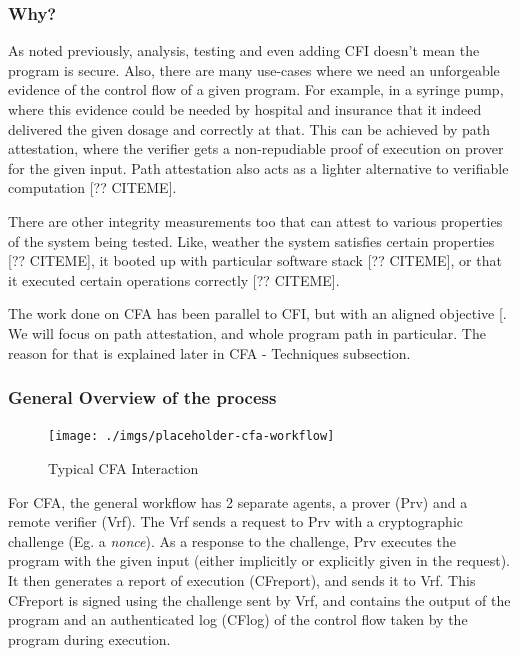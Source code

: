 \documentclass[a4paper, nobind]{templates/ociamthesis}
\begin{document}
\subsubsection{Why?}\label{why}

As noted previously, analysis, testing and even adding CFI doesn't mean the program is secure.
Also, there are many use-cases where we need an unforgeable evidence of the control flow
of a given program. For example, in a syringe pump, where this evidence could be
needed by hospital and insurance that it indeed delivered the given dosage and correctly at that.
This can be achieved by path attestation, where the verifier gets a non-repudiable
proof of execution on prover for the given input.
Path attestation also acts as a lighter alternative to verifiable computation {[}?? CITEME{]}.

There are other integrity measurements too that can attest to various properties
of the system being tested.
Like, weather the system satisfies certain properties {[}?? CITEME{]}, it booted up
with particular software stack {[}?? CITEME{]}, or that it executed certain operations correctly {[}?? CITEME{]}.

The work done on CFA has been parallel to CFI, but with an aligned objective {[}\citeproc{ref-sok}{2}{]}.
We will focus on path attestation, and whole program path in particular.
The reason for that is explained later in CFA - Techniques subsection.

\subsubsection{General Overview of the process}\label{general-overview-of-the-process}

\begin{figure}[H]

{\centering \texttt{[image: ./imgs/placeholder-cfa-workflow]} 

}

\caption{Typical CFA Interaction}\label{fig:cfa-workflow}
\end{figure}

For CFA, the general workflow has 2 separate agents, a prover (Prv) and a remote verifier (Vrf).
The Vrf sends a request to Prv with a cryptographic challenge (Eg. a \emph{nonce}).
As a response to the challenge, Prv executes the program with the given
input (either implicitly or explicitly given in the request).
It then generates a report of execution (CFreport), and sends it to Vrf.
This CFreport is signed using the challenge sent by Vrf, and contains the output of the program and an
authenticated log (CFlog) of the control flow taken by the program during execution.
\end{document}
